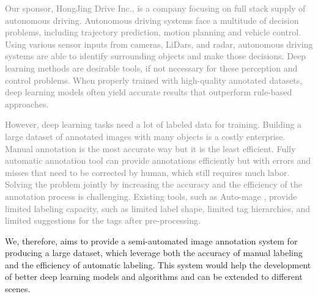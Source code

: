 \textcolor{gray}{Our sponsor, HongJing Drive Inc., is a company focusing on full stack supply of autonomous driving. Autonomous driving systems face a multitude of decision problems, including trajectory prediction, motion planning and vehicle control. Using various sensor inputs from cameras, LiDars, and radar, autonomous driving systems are able to identify surrounding objects and make those decisions. Deep learning methods are desirable tools, if not necessary for these perception and control problems. When properly trained with high-quality annotated datasets, deep learning models often yield accurate results that outperform rule-based approaches.}

\textcolor{gray}{However, deep learning tasks need a lot of labeled data for training. Building a large dataset of annotated images with many objects is a costly enterprise. Manual annotation is the most accurate way but it is the least efficient. Fully automatic annotation tool can provide annotations efficiently but with errors and misses that need to be corrected by human, which still requires much labor. Solving the problem jointly by increasing the accuracy and the efficiency of the annotation process is challenging. Existing tools, such as Auto-mage \cite{annomage}, provide limited labeling capacity, such as limited label shape, limited tag hierarchies, and limited suggestions for the tags after pre-processing.}

We, therefore, aims to provide a semi-automated image annotation system for producing a large dataset, which leverage both the accuracy of manual labeling and the efficiency of automatic labeling. This system would help the development of better deep learning models and algorithms and can be extended to different scenes. 



